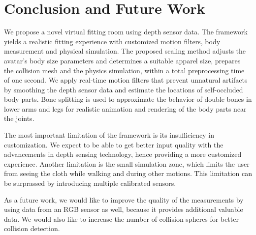 \documentclass[number,preprint,review,12pt]{elsarticle}
\begin{document}
\clearpage

\section{Conclusion and Future Work}
\label{sec:Conclusions}

We propose a novel virtual fitting room using depth sensor data. The framework yields a realistic fitting experience with customized motion filters, body measurement and physical simulation. The proposed scaling method adjusts the avatar's body size parameters and determines a suitable apparel size, prepares the collision mesh and the physics simulation, within a total preprocessing time of one second. We apply real-time motion filters that prevent unnatural artifacts by smoothing the depth sensor data and estimate the locations of self-occluded body parts. Bone splitting is used to approximate the behavior of double bones in lower arms and legs for realistic animation and rendering of the body parts near the joints.

{\color{red}
The most important limitation of the framework is its insufficiency in customization. We expect to be able to get better input quality with the advancements in depth sensing technology, hence providing a more customized experience. Another limitation is the small simulation zone, which limits the user from seeing the cloth while walking and during other motions. This limitation can be surprassed by introducing multiple calibrated sensors.  
}

As a future work, we would like to improve the quality of the measurements by using data from an RGB sensor as well, because it provides additional valuable data. We would also like to increase the number of collision spheres for better collision detection.
 
\end{document}
